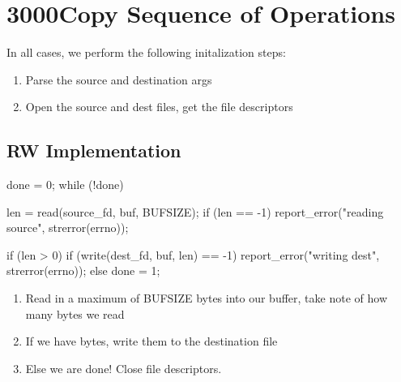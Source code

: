 
\section{3000Copy Sequence of Operations}
In all cases, we perform the following initalization steps:
\begin{enumerate}
\item Parse the source and destination args
\item Open the source and dest files, get the file descriptors
\end{enumerate}

\subsection{RW Implementation}
\begin{csrc}
done = 0;
while (!done) {
        len = read(source_fd, buf, BUFSIZE);
        if (len == -1) {
                report_error("reading source", strerror(errno));
        }

        if (len > 0) {
                if (write(dest_fd, buf, len) == -1) {
                        report_error("writing dest", strerror(errno));
                }
        } else {
                done = 1;
        }
}
\end{csrc}
\begin{enumerate}
\item Read in a maximum of BUFSIZE bytes into our buffer, take note of how many
  bytes we read
\item If we have bytes, write them to the destination file
\item Else we are done! Close file descriptors.
\end{enumerate}

